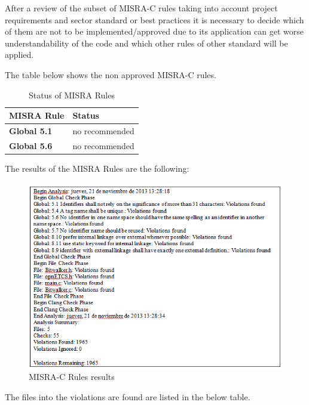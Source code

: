 After a review of the subset of MISRA-C rules taking into account project requirements and sector standard or best practices it is necessary to decide which of them are not to be implemented/approved due to its application can get worse understandability of the code and which other rules of other standard will be applied.

The table below shows the non approved MISRA-C rules.

{\footnotesize\sffamily\centering
  \begin{longtable}{||p{}|p{}||}
  \caption{Status of MISRA Rules}\\
    \hline\hline
    \textbf{MISRA Rule} & \textbf{Status} \\
    \hline\hline
    \endhead
    \hline\hline
    \endfoot
    \textbf{Global 5.1}
& no recommended
    \\
    \hline
    \textbf{Global 5.6}
& no recommended
    \\
    \hline
\end{longtable}}


The results of the MISRA Rules are the following:
\begin{figure}[H]
\centering
\includegraphics{./figures/understand.png}
\caption{MISRA-C Rules results}
\end{figure}

The files into the violations are found are listed in the below table.

